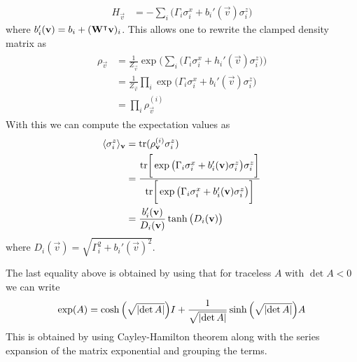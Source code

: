 \begin{align}
    H_\vec{v}
        &= -\sum_i \big(\Gamma_i \sigma_i^x + b_i'(\vec{v}) \sigma_i^z\big)
\end{align}
where \( b_i'(\mathbf{v}) = b_i + (\mathbf{W}^\intercal\mathbf{v})_i \).
This allows one to rewrite the clamped density matrix as
\begin{align}
\begin{split}
    \rho_\vec{v}
        &= \frac{1}{Z_\vec{v}} \exp\bigg( \sum_i \big(\Gamma_i \sigma_i^x + h_i'(\vec{v}) \sigma_i^z\big) \bigg) \\
        &= \frac{1}{Z_\vec{v}} \prod_i \exp \big(\Gamma_i \sigma_i^x + b_i'(\vec{v}) \sigma_i^z\big) \\
        &= \prod_i \rho_\vec{v}^{(i)}
\end{split}
\end{align}
With this we can compute the expectation values as
\begin{align}
\begin{split}
    \langle \sigma_i^z \rangle_{\mathbf{v}}
        &= \text{tr}(\rho_{\mathbf{v}}^{(i)}\sigma_i^z) \\
        &= \frac{\text{tr}\bigg[ \exp \big(\Gamma_i \sigma_i^x + b_i'(\mathbf{v}) \sigma_i^z\big) \sigma_i^z \bigg]}{\text{tr}\bigg[ \exp \big(\Gamma_i \sigma_i^x + b_i'(\mathbf{v}) \sigma_i^z\big) \bigg]} \\
        &= \frac{b_i'(\mathbf{v})}{D_i(\mathbf{v})} \tanh\big(D_i(\mathbf{v})\big)
\end{split}
\end{align}
where \( D_i(\vec{v}) = \sqrt{\Gamma_i^2 + b_i'(\vec{v})^2} \).

The last equality above is obtained by using that for traceless \( A \) with \( \det A < 0 \) we can write
\begin{align}
    \exp(A) = \cosh\Big(\sqrt{\lvert\det A\rvert}\Big) I + \frac{1}{\sqrt{\lvert\det A\rvert}}\sinh\Big(\sqrt{\lvert\det A\rvert}\Big) A
\end{align}
This is obtained by using Cayley-Hamilton theorem along with the series expansion of the matrix exponential and grouping the terms.

